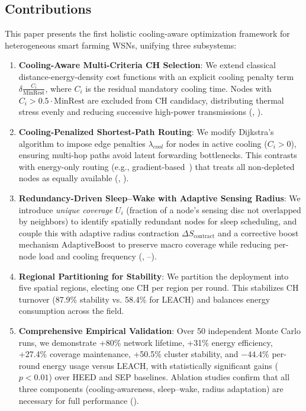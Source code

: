 \subsection{Contributions}
\label{subsec:contributions}

This paper presents the first holistic cooling-aware optimization framework for heterogeneous smart farming WSNs, unifying three subsystems:

\begin{enumerate}[label=\textbf{C\arabic*:},leftmargin=*]
  \item \textbf{Cooling-Aware Multi-Criteria CH Selection}:  
  We extend classical distance-energy-density cost functions with an explicit cooling penalty term $\delta \frac{C_i}{\text{MinRest}}$, where $C_i$ is the residual mandatory cooling time. Nodes with $C_i > 0.5 \cdot \text{MinRest}$ are excluded from CH candidacy, distributing thermal stress evenly and reducing successive high-power transmissions (, ).

  \item \textbf{Cooling-Penalized Shortest-Path Routing}:  
  We modify Dijkstra's algorithm to impose edge penalties $\lambda_{cool}$ for nodes in active cooling ($C_i>0$), ensuring multi-hop paths avoid latent forwarding bottlenecks. This contrasts with energy-only routing (e.g., gradient-based~\cite{schurgers2002energy}) that treats all non-depleted nodes as equally available (, ).

  \item \textbf{Redundancy-Driven Sleep--Wake with Adaptive Sensing Radius}:  
  We introduce \emph{unique coverage} $U_i$ (fraction of a node's sensing disc not overlapped by neighbors) to identify spatially redundant nodes for sleep scheduling, and couple this with adaptive radius contraction $\Delta S_{\text{contract}}$ and a corrective boost mechanism $\mathrm{AdaptiveBoost}$ to preserve macro coverage while reducing per-node load and cooling frequency (, --).

  \item \textbf{Regional Partitioning for Stability}:  
  We partition the deployment into five spatial regions, electing one CH per region per round. This stabilizes CH turnover (87.9\% stability vs. 58.4\% for LEACH) and balances energy consumption across the field.

  \item \textbf{Comprehensive Empirical Validation}:  
  Over 50 independent Monte Carlo runs, we demonstrate +80\% network lifetime, +31\% energy efficiency, +27.4\% coverage maintenance, +50.5\% cluster stability, and $-44.4$\% per-round energy usage versus LEACH, with statistically significant gains ($p<0.01$) over HEED and SEP baselines. Ablation studies confirm that all three components (cooling-awareness, sleep--wake, radius adaptation) are necessary for full performance ().
\end{enumerate}

